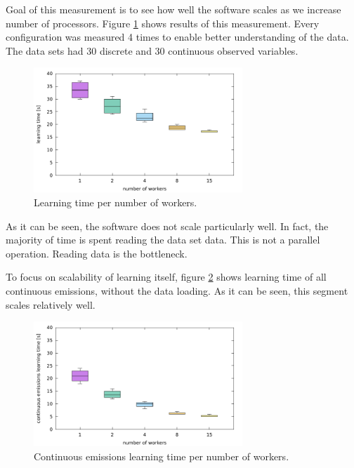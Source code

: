 \documentclass[thesis=B,english]{FITthesis}[2012/06/26]
\begin{document}
Goal of this measurement is to see how well the software scales as we increase number of processors. Figure \ref{fig:parallel_learning_time} shows results of this measurement. Every configuration was measured 4 times to enable better understanding of the data. The data sets had 30 discrete and 30 continuous observed variables.

\begin{figure}
	\centering
 	\includegraphics[width=0.7\textwidth]{parallel_learning_time}
 	\caption{Learning time per number of workers.}
 	\label{fig:parallel_learning_time}
\end{figure}

As it can be seen, the software does not scale particularly well. In fact, the majority of time is spent reading the data set data. This is not a parallel operation. Reading data is the bottleneck.

To focus on scalability of learning itself, figure \ref{fig:parallel_continuous_emissions_learning_time} shows learning time of all continuous emissions, without the data loading. As it can be seen, this segment scales relatively well.

\begin{figure}
	\centering
 	\includegraphics[width=0.7\textwidth]{parallel_continuous_emissions_learning_time}
 	\caption{Continuous emissions learning time per number of workers.}
 	\label{fig:parallel_continuous_emissions_learning_time}
\end{figure}
\end{document}
